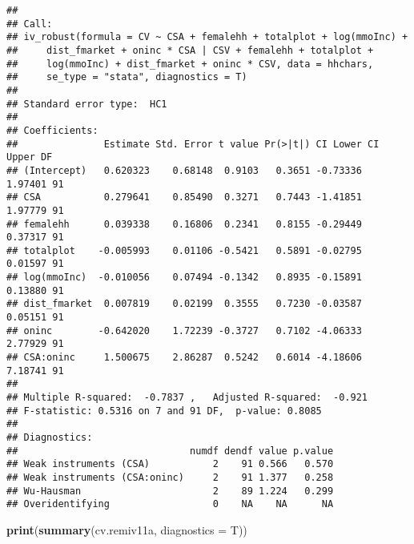 \documentclass[
]{article}
\newenvironment{Shaded}{\begin{snugshade}}{\end{snugshade}}
\newcommand{\DataTypeTok}[1]{\textcolor[rgb]{0.13,0.29,0.53}{#1}}
\newcommand{\KeywordTok}[1]{\textcolor[rgb]{0.13,0.29,0.53}{\textbf{#1}}}
\newcommand{\NormalTok}[1]{#1}
\begin{document}
\begin{verbatim}
## 
## Call:
## iv_robust(formula = CV ~ CSA + femalehh + totalplot + log(mmoInc) + 
##     dist_fmarket + oninc * CSA | CSV + femalehh + totalplot + 
##     log(mmoInc) + dist_fmarket + oninc * CSV, data = hhchars, 
##     se_type = "stata", diagnostics = T)
## 
## Standard error type:  HC1 
## 
## Coefficients:
##               Estimate Std. Error t value Pr(>|t|) CI Lower CI Upper DF
## (Intercept)   0.620323    0.68148  0.9103   0.3651 -0.73336  1.97401 91
## CSA           0.279641    0.85490  0.3271   0.7443 -1.41851  1.97779 91
## femalehh      0.039338    0.16806  0.2341   0.8155 -0.29449  0.37317 91
## totalplot    -0.005993    0.01106 -0.5421   0.5891 -0.02795  0.01597 91
## log(mmoInc)  -0.010056    0.07494 -0.1342   0.8935 -0.15891  0.13880 91
## dist_fmarket  0.007819    0.02199  0.3555   0.7230 -0.03587  0.05151 91
## oninc        -0.642020    1.72239 -0.3727   0.7102 -4.06333  2.77929 91
## CSA:oninc     1.500675    2.86287  0.5242   0.6014 -4.18606  7.18741 91
## 
## Multiple R-squared:  -0.7837 ,   Adjusted R-squared:  -0.921 
## F-statistic: 0.5316 on 7 and 91 DF,  p-value: 0.8085
## 
## Diagnostics:
##                              numdf dendf value p.value
## Weak instruments (CSA)           2    91 0.566   0.570
## Weak instruments (CSA:oninc)     2    91 1.377   0.258
## Wu-Hausman                       2    89 1.224   0.299
## Overidentifying                  0    NA    NA      NA
\end{verbatim}

\pagebreak

\begin{Shaded}
\begin{Highlighting}[]
\KeywordTok{print}\NormalTok{(}\KeywordTok{summary}\NormalTok{(cv.remiv11a, }\DataTypeTok{diagnostics =}\NormalTok{ T))}
\end{Highlighting}
\end{Shaded}
\end{document}
